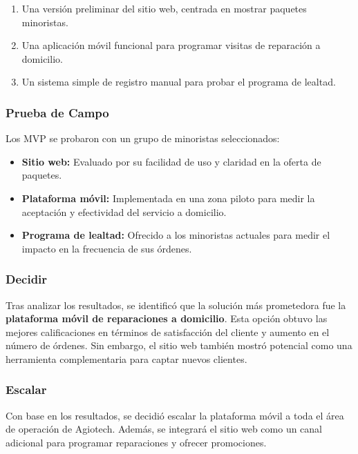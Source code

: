 \begin{enumerate}
	\item Una versión preliminar del sitio web, centrada en mostrar paquetes
	      minoristas.

	\item Una aplicación móvil funcional para programar visitas de reparación a domicilio.

	\item Un sistema simple de registro manual para probar el programa de lealtad.
\end{enumerate}

\subsubsection{Prueba de Campo}

Los MVP se probaron con un grupo de minoristas seleccionados:

\begin{itemize}
	\item \textbf{Sitio web:} Evaluado por su facilidad de uso y claridad en la
	      oferta de paquetes.

	\item \textbf{Plataforma móvil:} Implementada en una zona piloto para medir la
	      aceptación y efectividad del servicio a domicilio.

	\item \textbf{Programa de lealtad:} Ofrecido a los minoristas actuales para
	      medir el impacto en la frecuencia de sus órdenes.
\end{itemize}

\subsubsection{Decidir}

Tras analizar los resultados, se identificó que la solución más prometedora fue la
\textbf{plataforma móvil de reparaciones a domicilio}. Esta opción obtuvo las mejores
calificaciones en términos de satisfacción del cliente y aumento en el número de
órdenes. Sin embargo, el sitio web también mostró potencial como una herramienta
complementaria para captar nuevos clientes.

\subsubsection{Escalar}

Con base en los resultados, se decidió escalar la plataforma móvil a toda el área
de operación de Agiotech. Además, se integrará el sitio web como un canal adicional
para programar reparaciones y ofrecer promociones.

